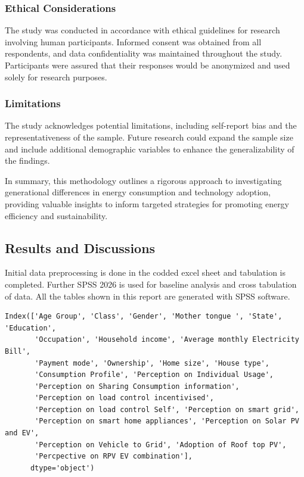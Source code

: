 \documentclass[
  letterpaper,
  DIV=11,
  numbers=noendperiod]{scrartcl}
\begin{document}
\subsubsection{Ethical Considerations}\label{ethical-considerations}

The study was conducted in accordance with ethical guidelines for
research involving human participants. Informed consent was obtained
from all respondents, and data confidentiality was maintained throughout
the study. Participants were assured that their responses would be
anonymized and used solely for research purposes.

\subsubsection{Limitations}\label{limitations}

The study acknowledges potential limitations, including self-report bias
and the representativeness of the sample. Future research could expand
the sample size and include additional demographic variables to enhance
the generalizability of the findings.

In summary, this methodology outlines a rigorous approach to
investigating generational differences in energy consumption and
technology adoption, providing valuable insights to inform targeted
strategies for promoting energy efficiency and sustainability.

\subsection{Results and Discussions}\label{results-and-discussions}

Initial data preprocessing is done in the codded excel sheet and
tabulation is completed. Further SPSS 2026 is used for baseline analysis
and cross tabulation of data. All the tables shown in this report are
generated with SPSS software.

\begin{verbatim}
Index(['Age Group', 'Class', 'Gender', 'Mother tongue ', 'State', 'Education',
       'Occupation', 'Household income', 'Average monthly Electricity Bill',
       'Payment mode', 'Ownership', 'Home size', 'House type',
       'Consumption Profile', 'Perception on Individual Usage',
       'Perception on Sharing Consumption information',
       'Perception on load control incentivised',
       'Perception on load control Self', 'Perception on smart grid',
       'Perception on smart home appliances', 'Perception on Solar PV and EV',
       'Perception on Vehicle to Grid', 'Adoption of Roof top PV',
       'Percpective on RPV EV combination'],
      dtype='object')
\end{verbatim}
\end{document}
